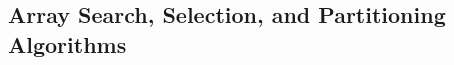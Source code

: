 \subsection{Array Search, Selection, and Partitioning Algorithms}%
\label{sub:fundamentals--array-search-sel-part-algorithms}




